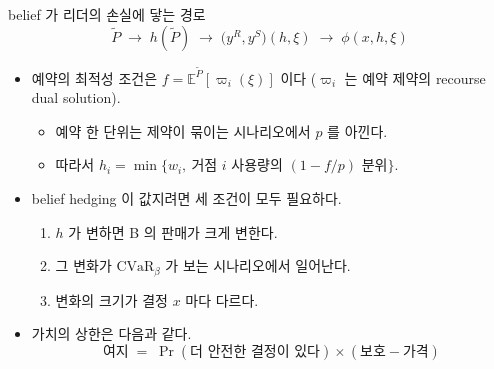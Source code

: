 \documentclass[aspectratio=169,11pt]{beamer}
\newcommand{\CVaR}{\mathrm{CVaR}}
\begin{document}
\begin{frame}{belief 가 리더의 손실에 닿는 경로}
\begin{equation*}
\tilde P \;\longrightarrow\; h(\tilde P) \;\longrightarrow\; \big(y^{R},y^{S}\big)(h,\xi) \;\longrightarrow\; \phi(x,h,\xi)
\end{equation*}
\begin{itemize}
  \item 예약의 최적성 조건은 $f = \mathbb{E}^{\tilde P}[\varpi_i(\xi)]$ 이다 ($\varpi_i$ 는 예약 제약의 recourse dual solution).
  \begin{itemize}
    \item 예약 한 단위는 제약이 묶이는 시나리오에서 $p$ 를 아낀다.
    \item 따라서 $h_i = \min\{w_i,\ \text{거점 } i \text{ 사용량의 } (1 - f/p) \text{ 분위}\}$.
  \end{itemize}
  \item belief hedging 이 값지려면 세 조건이 모두 필요하다.
  \begin{enumerate}
    \item[(C1)] $h$ 가 변하면 B 의 판매가 크게 변한다.
    \item[(C2)] 그 변화가 $\CVaR_\beta$ 가 보는 시나리오에서 일어난다.
    \item[(C3)] 변화의 크기가 결정 $x$ 마다 다르다.
  \end{enumerate}
  \item 가치의 상한은 다음과 같다.
  \begin{equation*}
  \text{여지} \;=\; \Pr(\text{더 안전한 결정이 있다}) \times (\text{보호} - \text{가격})
  \end{equation*}
\end{itemize}
\end{frame}
\end{document}
